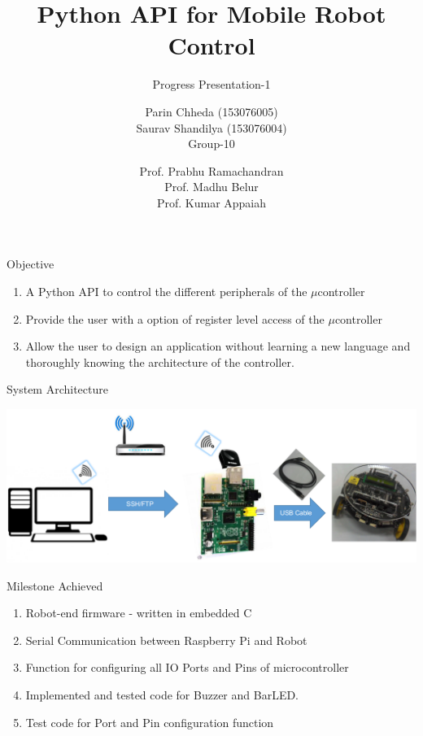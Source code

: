 \documentclass[10pt,handout,english]{beamer}
\title[] %
{Python API for Mobile Robot Control}
\subtitle{Progress Presentation-1}
\author[AE-663 Course Project 2016-17] %
{Parin Chheda (153076005) \\ Saurav Shandilya (153076004) \\ Group-10 }
\institute [Indian Institute of Technology Bombay]%
{
  
}
\date[\today] %
{Prof. Prabhu Ramachandran \\ Prof. Madhu Belur \\ Prof. Kumar Appaiah}
\begin{document}
 
\frame{\titlepage}

\begin{frame}{Objective}
\begin{enumerate}
	\item A Python API to control the different peripherals of the ${\mu}$controller
	\item Provide the user with a option of register level access of the ${\mu}$controller
	\item Allow the user to design an application without learning a new language and thoroughly knowing the architecture of the controller.
\end{enumerate}
\end{frame}

\begin{frame}{System Architecture}

\includegraphics[scale = 0.35]{system_diagram}

\end{frame}

\begin{frame}{Milestone Achieved}
\begin{enumerate}
\item Robot-end firmware - written in embedded C
\item Serial Communication between Raspberry Pi and Robot
\item Function for configuring all IO Ports and Pins of microcontroller
\item Implemented and tested code for Buzzer and BarLED.  
\item Test code for Port and Pin configuration function
\end{enumerate}

\end{frame}
\end{document}
